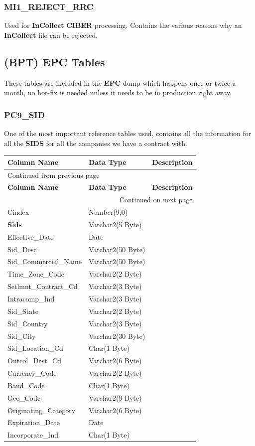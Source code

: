 \documentclass[12pt,twoside]{article}
\begin{document}
\subsubsection{MI1\_REJECT\_RRC}
\label{sec:orgheadline50}
Used for \textbf{InCollect} \textbf{CIBER} processing. Contains the various
reasons why an \textbf{InCollect} file can be rejected.
\newpage
\subsection{(BPT) EPC Tables}
\label{sec:orgheadline66}
These tables are included in the \textbf{EPC} dump which happens once
or twice a month, no hot-fix is needed unless it 
needs to be in
production right away.
\subsubsection{PC9\_SID}
\label{sec:orgheadline52}
One of the most important reference tables used, contains
all the information for all the \textbf{SIDS} for
all the companies we have a contract with.
\footnotesize

\begin{longtable}{l|l|l}
\hline
\textbf{Column Name} & \textbf{Data Type} & \textbf{Description}\\
\hline
\endfirsthead
\multicolumn{3}{l}{Continued from previous page} \\
\hline

\textbf{Column Name} & \textbf{Data Type} & \textbf{Description} \\

\hline
\endhead
\hline\multicolumn{3}{r}{Continued on next page} \\
\endfoot
\endlastfoot
\hline
Cindex & Number(9,0) & \\
\textbf{Sids} & Varchar2(5 Byte) & \\
Effective\_Date & Date & \\
Sid\_Desc & Varchar2(50 Byte) & \\
Sid\_Commercial\_Name & Varchar2(50 Byte) & \\
Time\_Zone\_Code & Varchar2(2 Byte) & \\
Setlmnt\_Contract\_Cd & Varchar2(3 Byte) & \\
Intracomp\_Ind & Varchar2(3 Byte) & \\
Sid\_State & Varchar2(2 Byte) & \\
Sid\_Country & Varchar2(3 Byte) & \\
Sid\_City & Varchar2(30 Byte) & \\
Sid\_Location\_Cd & Char(1 Byte) & \\
Outcol\_Dest\_Cd & Varchar2(6 Byte) & \\
Currency\_Code & Varchar2(2 Byte) & \\
Band\_Code & Char(1 Byte) & \\
Geo\_Code & Varchar2(9 Byte) & \\
Originating\_Category & Varchar2(6 Byte) & \\
Expiration\_Date & Date & \\
Incorporate\_Ind & Char(1 Byte) & \\
\hline
\end{longtable}
\end{document}
